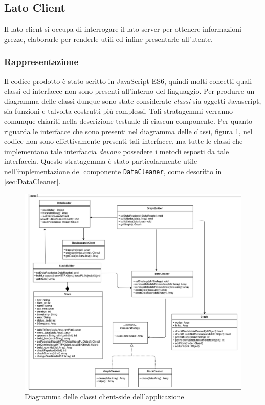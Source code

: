 
\subsection{Lato Client}
Il lato client si occupa di interrogare il lato server per ottenere informazioni grezze, elaborarle per renderle utili ed infine presentarle all'utente.

\label{sec:Componenti}
\subsubsection{Rappresentazione}
Il codice prodotto è stato scritto in JavaScript ES6, quindi molti concetti quali classi ed interfacce non sono presenti all'interno del linguaggio. Per produrre un diagramma delle classi dunque sono state considerate \emph{ classi } sia oggetti Javascript, sia funzioni e talvolta costrutti più complessi. Tali stratagemmi verranno comunque chiariti nella descrizione testuale di ciascun componente. Per quanto riguarda le interfacce che sono presenti nel diagramma delle classi, figura \ref{img:diagrammaClassiClient}, nel codice non sono effettivamente presenti tali interfacce, ma tutte le classi che implementano tale interfaccia \emph{devono} possedere i metodi esposti da tale interfaccia. Questo stratagemma è stato particolarmente utile nell'implementazione del componente \texttt{DataCleaner}, come descritto in \ref{sec:DataCleaner}.

\begin{figure}[H]
    \centering
    \includegraphics[width=1\textwidth]{Images/classi.png}
    \caption{Diagramma delle classi client-side dell'applicazione}
    \label{img:diagrammaClassiClient}
\end{figure}

